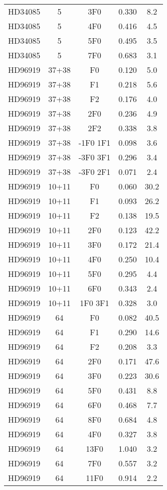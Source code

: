 \begin{table*}
\begin{tabular}{l c c c c}
HD34085 & 5 & 3F0 & 0.330 & 8.2\\ 
HD34085 & 5 & 4F0 & 0.416 & 4.5\\ 
HD34085 & 5 & 5F0 & 0.495 & 3.5\\ 
HD34085 & 5 & 7F0 & 0.683 & 3.1\\ 
\hline
HD96919 & 37+38 & F0 & 0.120 & 5.0\\ 
HD96919 & 37+38 & F1 & 0.218 & 5.6\\ 
HD96919 & 37+38 & F2 & 0.176 & 4.0\\ 
HD96919 & 37+38 & 2F0 & 0.236 & 4.9\\ 
HD96919 & 37+38 & 2F2 & 0.338 & 3.8\\ 
HD96919 & 37+38 & -1F0 1F1 & 0.098 & 3.6\\ 
HD96919 & 37+38 & -3F0 3F1 & 0.296 & 3.4\\ 
HD96919 & 37+38 & -3F0 2F1 & 0.071 & 2.4\\ 
\hline
HD96919 & 10+11 & F0 & 0.060 & 30.2\\ 
HD96919 & 10+11 & F1 & 0.093 & 26.2\\ 
HD96919 & 10+11 & F2 & 0.138 & 19.5\\ 
HD96919 & 10+11 & 2F0 & 0.123 & 42.2\\ 
HD96919 & 10+11 & 3F0 & 0.172 & 21.4\\ 
HD96919 & 10+11 & 4F0 & 0.250 & 10.4\\ 
HD96919 & 10+11 & 5F0 & 0.295 & 4.4\\ 
HD96919 & 10+11 & 6F0 & 0.343 & 2.4\\ 
HD96919 & 10+11 & 1F0 3F1 & 0.328 & 3.0\\ 
\hline
HD96919 & 64 & F0 & 0.082 & 40.5\\ 
HD96919 & 64 & F1 & 0.290 & 14.6\\ 
HD96919 & 64 & F2 & 0.208 & 3.3\\ 
HD96919 & 64 & 2F0 & 0.171 & 47.6\\ 
HD96919 & 64 & 3F0 & 0.223 & 30.6\\ 
HD96919 & 64 & 5F0 & 0.431 & 8.8\\ 
HD96919 & 64 & 6F0 & 0.468 & 7.7\\ 
HD96919 & 64 & 8F0 & 0.684 & 4.8\\ 
HD96919 & 64 & 4F0 & 0.327 & 3.8\\ 
HD96919 & 64 & 13F0 & 1.040 & 3.2\\ 
HD96919 & 64 & 7F0 & 0.557 & 3.2\\ 
HD96919 & 64 & 11F0 & 0.914 & 2.2\\ 
\hline

\end{tabular}
\end{table*}
